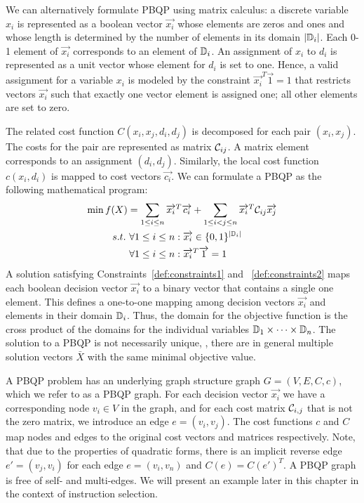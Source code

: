 We can alternatively formulate PBQP using matrix calculus: a discrete
variable $x_i$ is represented as a boolean vector $\vec{x_i}$ whose
elements are zeros and ones and whose length is determined by the
number of elements in its domain $|\mathbb D_i|$. Each 0-1 element of
$\vec{x_i}$ corresponds to an element of $\mathbb D_i$. An assignment
of $x_i$ to $d_i$ is represented as a unit vector whose element for
$d_i$ is set to one. Hence, a valid assignment for a variable $x_i$ is
modeled by the constraint $\vec{x_i}^T \vec{1}=1$ that restricts
vectors $\vec{x_i}$ such that exactly one vector element is assigned
one; all other elements are set to zero.

The related cost function $C(x_i,x_j,d_i,d_j)$ is decomposed for each
pair $(x_i,x_j)$. The costs for the pair are represented as matrix
${\mathcal C}_{ij}$. A matrix element corresponds to an assignment
$(d_i, d_j)$. Similarly, the local cost function $c(x_i,d_i)$ is
mapped to cost vectors $\vec{c_i}$. We can formulate a PBQP as the
following mathematical program:
\begin{align}
  \min f(X) &=
  \sum_{1 \leq i \leq n} \overrightarrow{x_i}^{T} \overrightarrow{c_i}  +
  \sum_{1 \leq i < j \leq n}
  \overrightarrow{x_i}^{T}  {\mathcal C}_{ij} \overrightarrow{x_j} \\
  \ s.t. \,        &\,  \forall 1 \leq i \leq n : \overrightarrow{x_i} \in \{0,1\}^{|\mathbb D_i|}  \label{def:constraints1}\\
  &\,  \forall 1 \leq i \leq n : \overrightarrow{x_i}^T \overrightarrow{1} = 1 \label{def:constraints2}
\end{align}
A solution satisfying Constraints~\ref{def:constraints1} and
~\ref{def:constraints2} maps each boolean decision vector $\vec{x_i}$
to a binary vector that contains a single one element. This defines a
one-to-one mapping among decision vectors $\vec{x_i}$ and elements in
their domain $\mathbb D_i$. Thus, the domain for the objective
function is the cross product of the domains for the individual
variables $\mathbb D_1 \times \dots \times \mathbb D_n$. The
solution to a PBQP is not necessarily unique, \ie, there are in
general multiple solution vectors $\bar{X}$ with the same minimal
objective value.

A PBQP problem has an underlying graph structure graph $G=(V,E,C,c)$,
which we refer to as a PBQP graph. For each decision vector
$\vec{x_i}$ we have a corresponding node $v_i \in V$ in the graph, and
for each cost matrix ${\mathcal C}_{i,j}$ that is not the zero
matrix, we introduce an edge $e=(v_i,v_j)$. The cost functions $c$ and
$C$ map nodes and edges to the original cost vectors and matrices
respectively. Note, that due to the properties of quadratic forms,
there is an implicit reverse edge $e'=(v_j,v_i)$ for each edge
$e=(v_i,v_n)$ and $C(e) = C(e')^T$. A PBQP graph is free of self- and
multi-edges. We will present an example later in this chapter in the
context of instruction selection.


